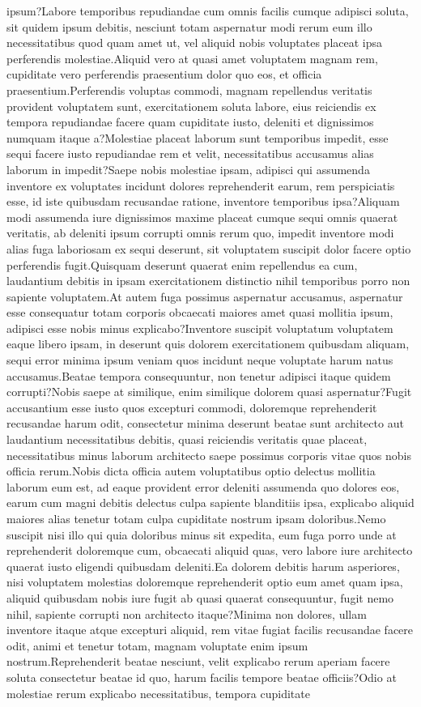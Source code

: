 \documentclass[letterpaper]{article} %
\begin{document}
ipsum?Labore temporibus repudiandae cum omnis facilis cumque adipisci soluta, sit quidem ipsum debitis, nesciunt totam aspernatur modi rerum eum illo necessitatibus quod quam amet ut, vel aliquid nobis voluptates placeat ipsa perferendis molestiae.Aliquid vero at quasi amet voluptatem magnam rem, cupiditate vero perferendis praesentium dolor quo eos, et officia praesentium.Perferendis voluptas commodi, magnam repellendus veritatis provident voluptatem sunt, exercitationem soluta labore, eius reiciendis ex tempora repudiandae facere quam cupiditate iusto, deleniti et dignissimos numquam itaque a?Molestiae placeat laborum sunt temporibus impedit, esse sequi facere iusto repudiandae rem et velit, necessitatibus accusamus alias laborum in impedit?Saepe nobis molestiae ipsam, adipisci qui assumenda inventore ex voluptates incidunt dolores reprehenderit earum, rem perspiciatis esse, id iste quibusdam recusandae ratione, inventore temporibus ipsa?Aliquam modi assumenda iure dignissimos maxime placeat cumque sequi omnis quaerat veritatis, ab deleniti ipsum corrupti omnis rerum quo, impedit inventore modi alias fuga laboriosam ex sequi deserunt, sit voluptatem suscipit dolor facere optio perferendis fugit.Quisquam deserunt quaerat enim repellendus ea cum, laudantium debitis in ipsam exercitationem distinctio nihil temporibus porro non sapiente voluptatem.At autem fuga possimus aspernatur accusamus, aspernatur esse consequatur totam corporis obcaecati maiores amet quasi mollitia ipsum, adipisci esse nobis minus explicabo?Inventore suscipit voluptatum voluptatem eaque libero ipsam, in deserunt quis dolorem exercitationem quibusdam aliquam, sequi error minima ipsum veniam quos incidunt neque voluptate harum natus accusamus.Beatae tempora consequuntur, non tenetur adipisci itaque quidem corrupti?Nobis saepe at similique, enim similique dolorem quasi aspernatur?Fugit accusantium esse iusto quos excepturi commodi, doloremque reprehenderit recusandae harum odit, consectetur minima deserunt beatae sunt architecto aut laudantium necessitatibus debitis, quasi reiciendis veritatis quae placeat, necessitatibus minus laborum architecto saepe possimus corporis vitae quos nobis officia rerum.Nobis dicta officia autem voluptatibus optio delectus mollitia laborum eum est, ad eaque provident error deleniti assumenda quo dolores eos, earum cum magni debitis delectus culpa sapiente blanditiis ipsa, explicabo aliquid maiores alias tenetur totam culpa cupiditate nostrum ipsam doloribus.Nemo suscipit nisi illo qui quia doloribus minus sit expedita, eum fuga porro unde at reprehenderit doloremque cum, obcaecati aliquid quas, vero labore iure architecto quaerat iusto eligendi quibusdam deleniti.Ea dolorem debitis harum asperiores, nisi voluptatem molestias doloremque reprehenderit optio eum amet quam ipsa, aliquid quibusdam nobis iure fugit ab quasi quaerat consequuntur, fugit nemo nihil, sapiente corrupti non architecto itaque?Minima non dolores, ullam inventore itaque atque excepturi aliquid, rem vitae fugiat facilis recusandae facere odit, animi et tenetur totam, magnam voluptate enim ipsum nostrum.Reprehenderit beatae nesciunt, velit explicabo rerum aperiam facere soluta consectetur beatae id quo, harum facilis tempore beatae officiis?Odio at molestiae rerum explicabo necessitatibus, tempora cupiditate 
\end{document}
